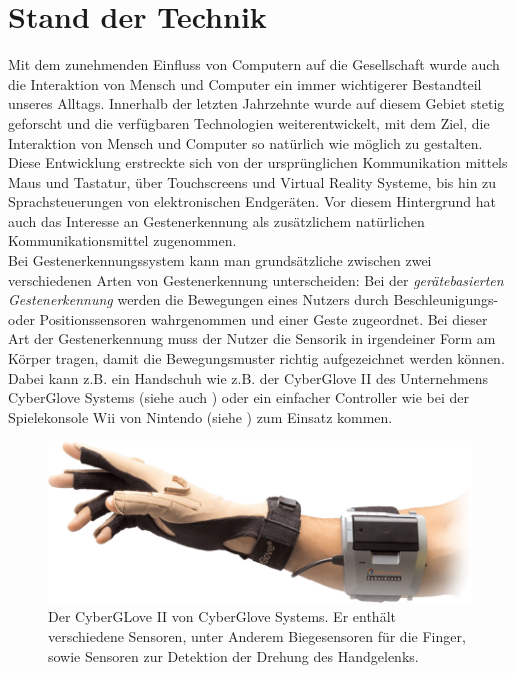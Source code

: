 \chapter{Stand der Technik}
\label{ch:StandDerTechnik}

Mit dem zunehmenden Einfluss von Computern auf die Gesellschaft wurde auch die Interaktion von Mensch und Computer ein immer wichtigerer Bestandteil unseres Alltags. Innerhalb der letzten Jahrzehnte wurde auf diesem Gebiet stetig geforscht und die verfügbaren Technologien weiterentwickelt, mit dem Ziel, die Interaktion von Mensch und Computer so natürlich wie möglich zu gestalten. Diese Entwicklung erstreckte sich von der ursprünglichen Kommunikation mittels Maus und Tastatur, über Touchscreens und Virtual Reality Systeme, bis hin zu Sprachsteuerungen von elektronischen Endgeräten. Vor diesem Hintergrund hat auch das Interesse an Gestenerkennung als zusätzlichem natürlichen Kommunikationsmittel zugenommen. \\
Bei Gestenerkennungssystem kann man grundsätzliche zwischen zwei verschiedenen Arten von Gestenerkennung unterscheiden: Bei der \textit{gerätebasierten Gestenerkennung} werden die Bewegungen eines Nutzers durch Beschleunigungs- oder Positionssensoren wahrgenommen und einer Geste zugeordnet. Bei dieser Art der Gestenerkennung muss der Nutzer die Sensorik in irgendeiner Form am Körper tragen, damit die Bewegungsmuster richtig aufgezeichnet werden können. Dabei kann z.B. ein Handschuh wie z.B. der CyberGlove II des Unternehmens CyberGlove Systems (siehe auch ) oder ein einfacher Controller wie bei der Spielekonsole Wii von Nintendo (siehe ) zum Einsatz kommen.
\begin{figure}[h]
	\centering
	\includegraphics[scale=0.4]{../figures/CyberGlove.png}
	\caption{Der CyberGLove II von CyberGlove Systems. Er enthält verschiedene Sensoren, unter Anderem Biegesensoren für die Finger, sowie Sensoren zur Detektion der Drehung des Handgelenks. }
	\label{fig:CyberGlove}
\end{figure}

